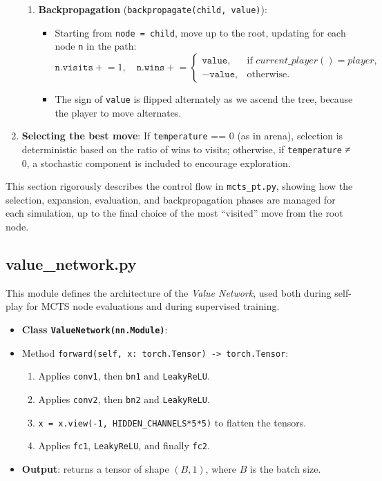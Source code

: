 \documentclass{report}
\begin{document}
\begin{enumerate}
\begin{enumerate}
      \item \textbf{Backpropagation} (\texttt{backpropagate(child, value)}):
        \begin{itemize}
          \item Starting from \texttt{node = child}, move up to the root, updating for each node \texttt{n} in the path:
            \[
              \texttt{n.visits} \mathrel{+}= 1,
              \quad
              \texttt{n.wins} \mathrel{+}= 
              \begin{cases}
                \texttt{value}, & \text{if } current\_player() = player,\\
                -\texttt{value}, & \text{otherwise}.
              \end{cases}
            \]
          \item The sign of \texttt{value} is flipped alternately as we ascend the tree, because the player to move alternates.
        \end{itemize}
    \end{enumerate}

  \item \textbf{Selecting the best move}:
      If \texttt{temperature} == 0 (as in arena), selection is deterministic based on the ratio of wins to visits; otherwise, if \texttt{temperature} ≠ 0, a stochastic component is included to encourage exploration.
\end{enumerate}

This section rigorously describes the control flow in \texttt{mcts\_pt.py}, showing how the selection, expansion, evaluation, and backpropagation phases are managed for each simulation, up to the final choice of the most “visited” move from the root node.

\subsection{value\_network.py}
\label{sec:value_network}
This module defines the architecture of the \textit{Value Network}, used both during self-play for MCTS node evaluations and during supervised training.

\begin{itemize}
  \item \textbf{Class \texttt{ValueNetwork(nn.Module)}}:
      \item Method \texttt{forward(self, x: torch.Tensor) -> torch.Tensor}:
        \begin{enumerate}
          \item Applies \texttt{conv1}, then \texttt{bn1} and \texttt{LeakyReLU}.
          \item Applies \texttt{conv2}, then \texttt{bn2} and \texttt{LeakyReLU}.
          \item \texttt{x = x.view(-1, HIDDEN\_CHANNELS*5*5)} to flatten the tensors.
          \item Applies \texttt{fc1}, \texttt{LeakyReLU}, and finally \texttt{fc2}.
        \end{enumerate}
      \item \textbf{Output}: returns a tensor of shape \((B,1)\), where \(B\) is the batch size.  
    \end{itemize}
\end{document}
